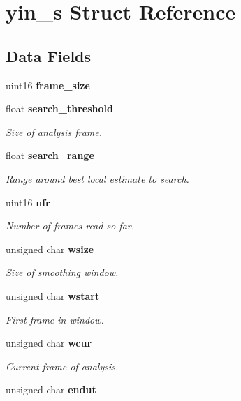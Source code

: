 \section{yin\-\_\-s Struct Reference}
\label{structyin__s}
\subsection*{Data Fields}
\begin{DoxyCompactItemize}
\item 
uint16 {\bfseries frame\-\_\-size}\label{structyin__s_a25a7e0400397ab1fcbf82f4d0568722a}

\item 
float {\bf search\-\_\-threshold}
\begin{DoxyCompactList}\small\item\em Size of analysis frame. \end{DoxyCompactList}\item 
float {\bf search\-\_\-range}\label{structyin__s_a6dd2dda40ad048fa8be8a21cf59ca77b}

\begin{DoxyCompactList}\small\item\em Range around best local estimate to search. \end{DoxyCompactList}\item 
uint16 {\bf nfr}
\begin{DoxyCompactList}\small\item\em Number of frames read so far. \end{DoxyCompactList}\item 
unsigned char {\bf wsize}
\begin{DoxyCompactList}\small\item\em Size of smoothing window. \end{DoxyCompactList}\item 
unsigned char {\bf wstart}
\begin{DoxyCompactList}\small\item\em First frame in window. \end{DoxyCompactList}\item 
unsigned char {\bf wcur}
\begin{DoxyCompactList}\small\item\em Current frame of analysis. \end{DoxyCompactList}\item 
unsigned char {\bf endut}\label{structyin__s_a61ca0fc8444a1bdde10aca37dc9f0f56}


\end{DoxyCompactItemize}
